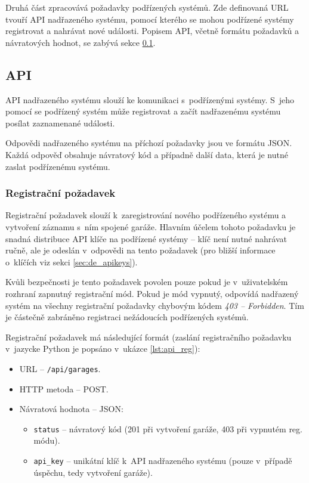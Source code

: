 Druhá část zpracovává požadavky podřízených systémů. Zde definovaná URL tvouří API nadřazeného systému, pomocí kterého se mohou podřízené systémy registrovat a nahrávat nové události. Popisem API, včetně formátu požadavků a návratových hodnot, se zabývá sekce \ref{sec:de_api}.

\subsection{API}
\label{sec:de_api}


API nadřazeného systému slouží ke komunikaci s~podřízenými systémy. S~jeho pomocí se podřízený systém může registrovat a začít nadřazenému systému posílat zaznamenané události.

Odpovědi nadřazeného systému na příchozí požadavky jsou ve formátu JSON. Každá odpověď obsahuje návratový kód a případně další data, která je nutné zaslat podřízenému systému.

\subsubsection{Registrační požadavek}

Registrační požadavek slouží k~zaregistrování nového podřízeného systému a vytvoření záznamu s~ním spojené garáže. Hlavním účelem tohoto požadavku je snadná distribuce API klíče na podřízené systémy -- klíč není nutné nahrávat ručně, ale je odeslán v~odpovědi na tento požadavek (pro bližší informace o~klíčích viz sekci \ref{sec:de_apikeys}).

Kvůli bezpečnosti je tento požadavek povolen pouze pokud je v~uživatelském rozhraní zapnutný registrační mód. Pokud je mód vypnutý, odpovídá nadřazený systém na všechny registrační požadavky chybovým kódem \textit{403 -- Forbidden}. Tím je částečně zabráněno registraci nežádoucích podřízených systémů.

Registrační požadavek má následující formát (zaslání registračního požadavku v~jazycke Python je popsáno v~ukázce \ref{lst:api_reg}):

\begin{itemize}
    \item URL -- \texttt{/api/garages}.
    \item HTTP metoda -- POST.
    \item Návratová hodnota -- JSON:
    \begin{itemize}
        \item \texttt{status} -- návratový kód (201 při vytvoření garáže, 403 při vypnutém reg. módu).
        \item \texttt{api\_key} -- unikátní klíč k~API nadřazeného systému (pouze v~případě úspěchu, tedy vytvoření garáže).
    \end{itemize}
\end{itemize}

